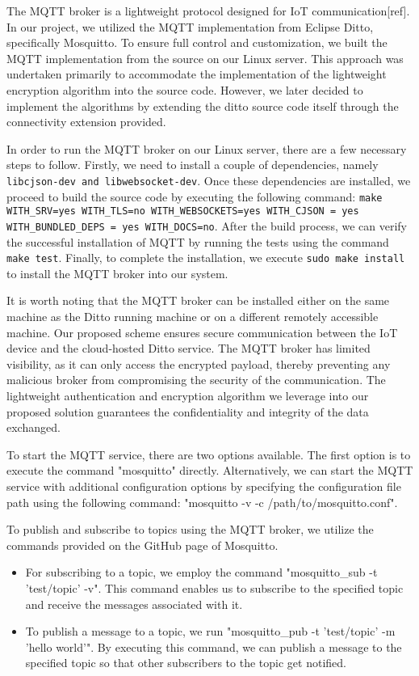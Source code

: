 The MQTT broker is a lightweight protocol designed for IoT communication[ref]. In our project, we utilized the MQTT implementation from Eclipse Ditto, specifically Mosquitto. To ensure full control and customization, we built the MQTT implementation from the source on our Linux server. This approach was undertaken primarily to accommodate the implementation of the lightweight encryption algorithm into the source code. However, we later decided to implement the algorithms by extending the ditto source code itself through the connectivity extension provided. 

In order to run the MQTT broker on our Linux server, there are a few necessary steps to follow. Firstly, we need to install a couple of dependencies, namely \texttt{libcjson-dev and libwebsocket-dev}. Once these dependencies are installed, we proceed to build the source code by executing the following command: \texttt{make WITH\_SRV=yes WITH\_TLS=no WITH\_WEBSOCKETS=yes WITH\_CJSON = yes WITH\_BUNDLED\_DEPS = yes WITH\_DOCS=no}. After the build process, we can verify the successful installation of MQTT by running the tests using the command \texttt{make test}. Finally, to complete the installation, we execute \texttt{sudo make install} to install the MQTT broker into our system. 


It is worth noting that the MQTT broker can be installed either on the same machine as the Ditto running machine or on a different remotely accessible machine. Our proposed scheme ensures secure communication between the IoT device and the cloud-hosted Ditto service. The MQTT broker has limited visibility, as it can only access the encrypted payload, thereby preventing any malicious broker from compromising the security of the communication. The lightweight authentication and encryption algorithm we leverage into our proposed solution guarantees the confidentiality and integrity of the data exchanged.

To start the MQTT service, there are two options available. The first option is to execute the command "mosquitto" directly. Alternatively, we can start the MQTT service with additional configuration options by specifying the configuration file path using the following command: "mosquitto -v -c /path/to/mosquitto.conf".

To publish and subscribe to topics using the MQTT broker, we utilize the commands provided on the GitHub page of Mosquitto. 
    \begin{itemize}
        \item For subscribing to a topic, we employ the command "mosquitto\_sub -t 'test/topic' -v". This command enables us to subscribe to the specified topic and receive the messages associated with it. 
        \item To publish a message to a topic, we run "mosquitto\_pub -t 'test/topic' -m 'hello world'". By executing this command, we can publish a message to the specified topic so that other subscribers to the topic get notified. 
    \end{itemize}
    
    
